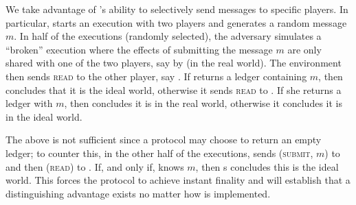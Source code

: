   \begin{proofsketch}
    We take advantage of \adversary's ability to selectively send messages to
    specific players. In particular, \environment{} starts an execution with two
    players and generates a random message $m$. In half of the executions
    (randomly selected),  the adversary simulates a ``broken''  \perfectprot{}
    execution where the effects of submitting the message $m$ are only shared
    with one of the two players, say \alice{} by \adversary{} (in the real
    world). The environment then sends \textsc{read} to the other player, say
    \bob. If \bob{} returns a ledger containing $m$, then \environment{}
    concludes that it is the ideal world, otherwise it sends \textsc{read} to
    \alice. If she returns a ledger with $m$, then \environment{} concludes it
    is in the real world, otherwise it concludes it is in the ideal world.

    The above is not sufficient since a protocol may choose to  return an empty
    ledger; to counter this, in the other half of the executions, \environment{}
    sends (\textsc{submit}, $m$) to \alice{} and then (\textsc{read}) to \bob.
    If, and only if, \bob{} knows $m$, then \environment{}s concludes this is
    the ideal world.   This  forces the \perfectprot{}  protocol to achieve
    instant finality and will establish that a distinguishing advantage exists
    no matter how \perfectprot{} is implemented.
  \end{proofsketch}
